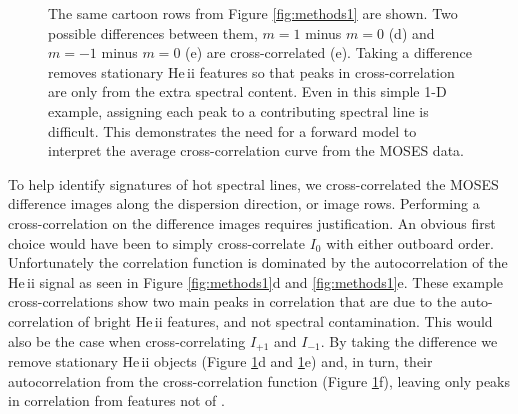 \begin{figure}
{
 	 		}
 	 		\caption{The same cartoon rows from Figure \ref{fig:methods1} are shown. Two possible differences between them, $m=1$ minus $m=0$ (d) and $m=-1$ minus $m=0$ (e) are cross-correlated (e).  Taking a difference removes stationary He\,{\sc ii} features so that peaks in cross-correlation are only from the extra spectral content.  Even in this simple 1-D example, assigning each peak to a contributing spectral line is difficult. This demonstrates the need for a forward model to interpret the average cross-correlation curve from the MOSES data.}
 	 		\label{fig:methods2}
 	 	\end{figure}
        
        To help identify signatures of hot spectral lines, we cross-correlated the MOSES difference images along the dispersion direction, or image rows.
        Performing a cross-correlation on the difference images requires justification.  
        An obvious first choice would have been to simply cross-correlate $I_0$ with either outboard order.  
        Unfortunately the correlation function is dominated by the autocorrelation of the He\,{\sc ii} signal as seen in Figure \ref{fig:methods1}d and \ref{fig:methods1}e.  
        These example cross-correlations show two main peaks in correlation that are due to the auto-correlation of bright He\,{\sc ii} features, and not spectral contamination.  
        This would also be the case when cross-correlating $I_{+1}$ and $I_{-1}$.  
        By taking the difference we remove stationary He\,{\sc ii} objects (Figure \ref{fig:methods2}d and \ref{fig:methods2}e) and, in turn, their autocorrelation from the cross-correlation function (Figure \ref{fig:methods2}f), leaving only peaks in correlation from features not of \heii.
		
